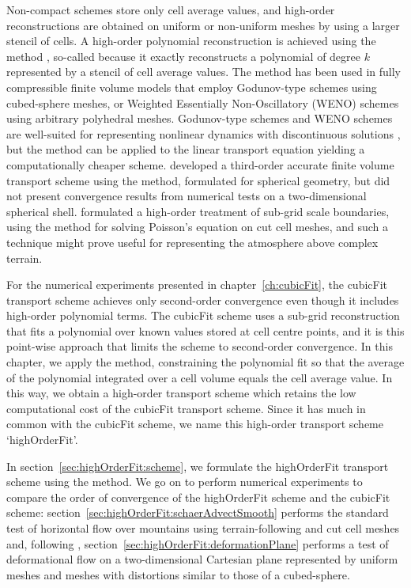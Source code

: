 Non-compact schemes store only cell average values, and high-order reconstructions are obtained on uniform or non-uniform meshes by using a larger stencil of cells.
A high-order polynomial reconstruction is achieved using the \kexact{} method \citep{barth1995}, so-called because it exactly reconstructs a polynomial of degree $k$ represented by a stencil of cell average values.
The \kexact{} method has been used in fully compressible finite volume models that employ Godunov-type schemes \citep{ullrich-jablonowski2012} using cubed-sphere meshes, or Weighted Essentially Non-Oscillatory (WENO) schemes \citep{tsoutsanis-drikakis2016} using arbitrary polyhedral meshes.
Godunov-type schemes and WENO schemes are well-suited for representing nonlinear dynamics with discontinuous solutions \citep{leveque2002}, but the \kexact{} method can be applied to the linear transport equation yielding a computationally cheaper scheme.
\citet{sjoegreen2012} developed a third-order accurate finite volume transport scheme using the \kexact{} method, formulated for spherical geometry, but did not present convergence results from numerical tests on a two-dimensional spherical shell.
\citet{devendran2017} formulated a high-order treatment of sub-grid scale boundaries, using the \kexact{} method for solving Poisson's equation on cut cell meshes, and such a technique might prove useful for representing the atmosphere above complex terrain.

For the numerical experiments presented in chapter~\ref{ch:cubicFit}, the cubicFit transport scheme achieves only second-order convergence even though it includes high-order polynomial terms.
The cubicFit scheme uses a sub-grid reconstruction that fits a polynomial over known values stored at cell centre points, and it is this point-wise approach that limits the scheme to second-order convergence.
In this chapter, we apply the \kexact{} method, constraining the polynomial fit so that the average of the polynomial integrated over a cell volume equals the cell average value.
In this way, we obtain a high-order transport scheme which retains the low computational cost of the cubicFit transport scheme.
Since it has much in common with the cubicFit scheme, we name this high-order transport scheme `highOrderFit'.

In section~\ref{sec:highOrderFit:scheme}, we formulate the highOrderFit transport scheme using the \kexact{} method.
We go on to perform numerical experiments to compare the order of convergence of the highOrderFit scheme and the cubicFit scheme: section~\ref{sec:highOrderFit:schaerAdvectSmooth} performs the standard test of horizontal flow over mountains using terrain-following and cut cell meshes and, following \citet{chen2017}, section~\ref{sec:highOrderFit:deformationPlane} performs a test of deformational flow on a two-dimensional Cartesian plane represented by uniform meshes and meshes with distortions similar to those of a cubed-sphere.





